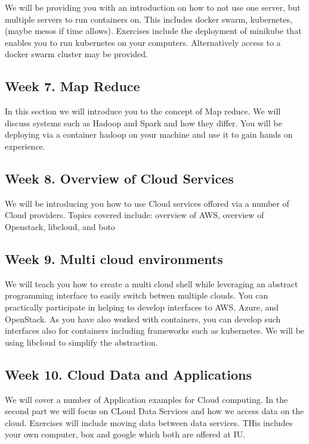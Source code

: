We will be providing you with an introduction on how to not use one
server, but multiple servers to run containers on. This includes
docker swarm, kubernetes, (maybe mesos if time allows).
Exercises include the deployment of minikube that enables you to run
kubernetes on your computers. Alternatively access to a docker swarm
cluster may be provided.

\subsection{Week 7. Map Reduce}

In this section we will introduce you to the concept of Map reduce. We
will discuss systems such as Hadoop and Spark and how they differ. You
will be deploying via a container hadoop on your machine and use it to
gain hands on experience.

\subsection{Week 8. Overview of Cloud Services}

We will be introducing you how to use Cloud services offored via a
number of Cloud providers. Topics covered include: overview of AWS,
overview of Openstack, libcloud, and boto

\subsection{Week 9. Multi cloud environments}

We will teach you how to create a multi cloud shell while leveraging
an abstract programming interface to easily switch betwen multiple
clouds. You can practically participate in helping to develop
interfaces to AWS, Azure, and OpenStack. As you have also worked with
containers, you can develop such interfaces also for containers
including frameworks such as kubernetes. We will be using libcloud to
simplify the abstraction.
	
\subsection{Week 10. Cloud Data and Applications}

We will cover a number of Application examples for Cloud computing. In
the second part we will focus on CLoud Data Services and how we access
data on the cloud. Exercises will include moving data between data
services. THis includes your own computer, box and google which both
are offered at IU.



